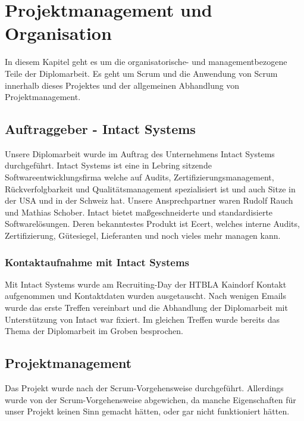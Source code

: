 
\renewcommand{\theauthor}{Matthias Franz}

\chapter{Projektmanagement und Organisation}
In diesem Kapitel geht es um die organisatorische- und managementbezogene Teile der Diplomarbeit. Es geht um Scrum und die Anwendung von Scrum innerhalb dieses Projektes und der allgemeinen Abhandlung von Projektmanagement.

\label{sec:ProjUOrg}

\section{Auftraggeber - Intact Systems}
\label{sec:Auftraggeber}
Unsere Diplomarbeit wurde im Auftrag des Unternehmens Intact Systems durchgeführt. Intact Systems ist eine in Lebring sitzende Softwareentwicklungsfirma welche auf Audits, Zertifizierungsmanagement, Rückverfolgbarkeit und Qualitätsmanagement spezialisiert ist und auch Sitze in der USA und in der Schweiz hat. Unsere Ansprechpartner waren Rudolf Rauch und Mathias Schober. Intact bietet maßgeschneiderte und standardisierte Softwarelösungen. Deren bekanntestes Produkt ist Ecert, welches interne Audits, Zertifizierung, Gütesiegel, Lieferanten und noch vieles mehr managen kann.
	\subsection*{Kontaktaufnahme mit Intact Systems}
	Mit Intact Systems wurde am Recruiting-Day der HTBLA Kaindorf Kontakt aufgenommen und Kontaktdaten wurden ausgetauscht. Nach wenigen Emails wurde das erste Treffen vereinbart und die Abhandlung der Diplomarbeit mit Unterstützung von Intact war fixiert. Im gleichen Treffen wurde bereits das Thema der Diplomarbeit im Groben besprochen.  
	
\section{Projektmanagement}
\label{sec:Projektmanagement}
Das Projekt wurde nach der Scrum-Vorgehensweise durchgeführt. Allerdings wurde von der Scrum-Vorgehensweise abgewichen, da manche Eigenschaften für unser Projekt keinen Sinn gemacht hätten, oder gar nicht funktioniert hätten.
